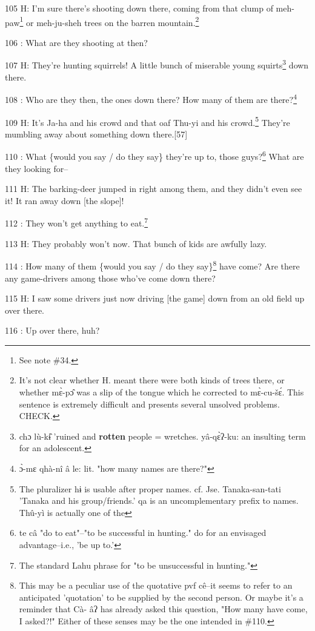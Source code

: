 105 H: I'm sure there's shooting down there, coming from that clump of meh-paw\footnote{See note \#34.}
or meh-ju-sheh trees on the barren mountain.\footnote{It's not clear whether H. meant there were both kinds of trees there, or whether mɛ̀-pɔ̂ was a slip of the tongue which he corrected to mɛ̀-cu-šɛ́. This sentence is extremely difficult and presents several unsolved problems. CHECK.}

106  : What are they shooting at then?

107 H: They're hunting squirrels! A little bunch of miserable young squirts\footnote{chɔ lù-kɨ̂ 'ruined and \textbf{rotten} people = wretches.  yâ-qɛ̀ʔ-ku: an insulting term for an adolescent.}
down there.

108  : Who are they then, the ones down there? How many of them are there?\footnote{ɔ̀-mɛ qhà-nî  â le: lit. "how many names are there?"}

109 H: It's Ja-ha and his crowd and that oaf Thu-yi and his crowd.\footnote{The pluralizer hɨ is usable after proper names. cf. Jse. Tanaka-san-tati 'Tanaka and his group/friends.' qa is an uncomplementary prefix to names. Thû-yì is actually one of the} They're
mumbling away about something down there.[57]

110  : What \{would you say / do they say\} they're up to, those guys?\footnote{te câ "do to eat"--"to be successful in hunting." do for an envisaged advantage--i.e., 'be up to.'}  What
are they looking for--

111 H: The barking-deer jumped in right among them, and they didn't even see it!
It ran away down [the slope]!

112  : They won't get anything to eat.\footnote{The standard Lahu phrase for "to be unsuccessful in hunting."}

113 H: They probably won't now. That bunch of kids are awfully lazy.

114  : How many of them \{would you say / do they say\}\footnote{This may be a peculiar use of the quotative pvf cê--it seems to refer to an anticipated 'quotation' to be supplied by the second person. Or maybe it's a reminder that Cà- âʔ has already asked this question, "How many have come, I asked?!" Either of these senses may be the one intended in \#110.} have come? Are there
any game-drivers among those who've come down there?

115 H: I saw some drivers just now driving [the game] down from an old field up
over there.

116  : Up over there, huh?

